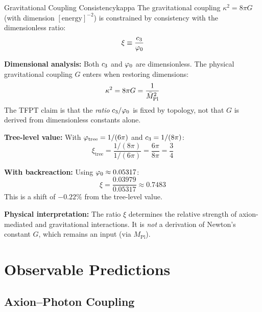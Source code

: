 \begin{corollary}{Gravitational Coupling Consistency}{kappa}
The gravitational coupling $\kappa^2 = 8\pi G$ (with dimension $[\text{energy}]^{-2}$) 
is constrained by consistency with the dimensionless ratio:
\begin{equation}
    \xi \equiv \frac{c_3}{\varphi_0}
\end{equation}

\textbf{Dimensional analysis:} Both $c_3$ and $\varphi_0$ are dimensionless. The 
physical gravitational coupling $G$ enters when restoring dimensions:
\begin{equation}
    \kappa^2 = 8\pi G = \frac{1}{\bar{M}_{\mathrm{Pl}}^2}
\end{equation}
The TFPT claim is that the \emph{ratio} $c_3/\varphi_0$ is fixed by topology, 
not that $G$ is derived from dimensionless constants alone.

\textbf{Tree-level value:} With $\varphi_{\mathrm{tree}} = 1/(6\pi)$ and $c_3 = 1/(8\pi)$:
\begin{equation}
    \xi_{\text{tree}} = \frac{1/(8\pi)}{1/(6\pi)} = \frac{6\pi}{8\pi} = \frac{3}{4}
\end{equation}

\textbf{With backreaction:} Using $\varphi_0 \approx 0.05317$:
\begin{equation}
    \xi = \frac{0.03979}{0.05317} \approx 0.7483
\end{equation}
This is a shift of $-0.22\%$ from the tree-level value.

\textbf{Physical interpretation:} The ratio $\xi$ determines the relative strength 
of axion-mediated and gravitational interactions. It is \emph{not} a derivation of 
Newton's constant $G$, which remains an input (via $M_{\text{Pl}}$).
\end{corollary}

\section{Observable Predictions}

\subsection{Axion--Photon Coupling}

